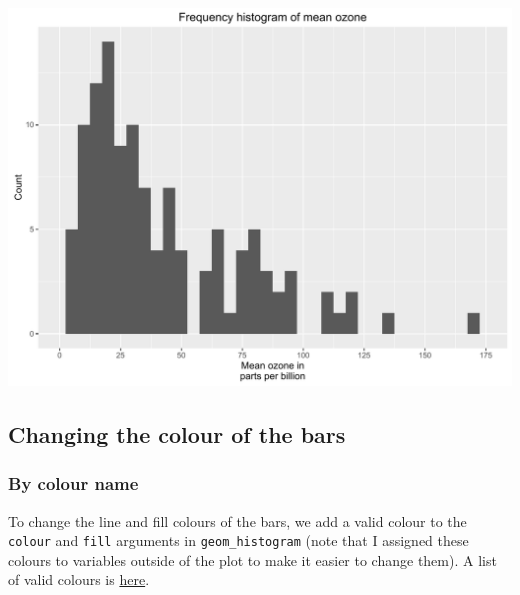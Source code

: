 \documentclass[]{article}
\begin{document}
\begin{center}\includegraphics{0_all_posts_pdf/histogram_8-1} \end{center}

\subsection{Changing the colour of the
bars}\label{changing-the-colour-of-the-bars}

\subsubsection{By colour name}\label{by-colour-name}

To change the line and fill colours of the bars, we add a valid colour
to the \texttt{colour} and \texttt{fill} arguments in
\texttt{geom\_histogram} (note that I assigned these colours to
variables outside of the plot to make it easier to change them). A list
of valid colours is
\href{http://www.stat.columbia.edu/~tzheng/files/Rcolor.pdf}{here}.
\end{document}
